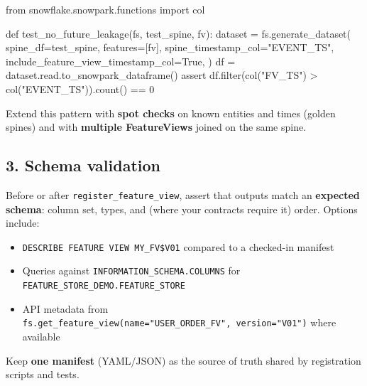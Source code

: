 \documentclass[
  letterpaper,
  DIV=11,
  numbers=noendperiod]{scrreprt}
\newenvironment{Shaded}{\begin{snugshade}}{\end{snugshade}}
\newcommand{\BuiltInTok}[1]{\textcolor[rgb]{0.00,0.23,0.31}{#1}}
\newcommand{\ControlFlowTok}[1]{\textcolor[rgb]{0.00,0.23,0.31}{#1}}
\newcommand{\DecValTok}[1]{\textcolor[rgb]{0.68,0.00,0.00}{#1}}
\newcommand{\ImportTok}[1]{\textcolor[rgb]{0.00,0.46,0.62}{#1}}
\newcommand{\KeywordTok}[1]{\textcolor[rgb]{0.00,0.23,0.31}{#1}}
\newcommand{\NormalTok}[1]{\textcolor[rgb]{0.00,0.23,0.31}{#1}}
\newcommand{\OperatorTok}[1]{\textcolor[rgb]{0.37,0.37,0.37}{#1}}
\newcommand{\StringTok}[1]{\textcolor[rgb]{0.13,0.47,0.30}{#1}}
\newcommand{\VariableTok}[1]{\textcolor[rgb]{0.07,0.07,0.07}{#1}}
\providecommand{\tightlist}{%
  \setlength{\itemsep}{0pt}\setlength{\parskip}{0pt}}\usepackage{longtable,booktabs,array}
\begin{document}
\begin{Shaded}
\begin{Highlighting}[]
\ImportTok{from}\NormalTok{ snowflake.snowpark.functions }\ImportTok{import}\NormalTok{ col}

\KeywordTok{def}\NormalTok{ test\_no\_future\_leakage(fs, test\_spine, fv):}
\NormalTok{    dataset }\OperatorTok{=}\NormalTok{ fs.generate\_dataset(}
\NormalTok{        spine\_df}\OperatorTok{=}\NormalTok{test\_spine,}
\NormalTok{        features}\OperatorTok{=}\NormalTok{[fv],}
\NormalTok{        spine\_timestamp\_col}\OperatorTok{=}\StringTok{"EVENT\_TS"}\NormalTok{,}
\NormalTok{        include\_feature\_view\_timestamp\_col}\OperatorTok{=}\VariableTok{True}\NormalTok{,}
\NormalTok{    )}
\NormalTok{    df }\OperatorTok{=}\NormalTok{ dataset.read.to\_snowpark\_dataframe()}
    \ControlFlowTok{assert}\NormalTok{ df.}\BuiltInTok{filter}\NormalTok{(col(}\StringTok{"FV\_TS"}\NormalTok{) }\OperatorTok{\textgreater{}}\NormalTok{ col(}\StringTok{"EVENT\_TS"}\NormalTok{)).count() }\OperatorTok{==} \DecValTok{0}
\end{Highlighting}
\end{Shaded}

Extend this pattern with \textbf{spot checks} on known entities and
times (golden spines) and with \textbf{multiple FeatureViews} joined on
the same spine.

\hypertarget{schema-validation}{%
\subsection{3. Schema validation}\label{schema-validation}}

Before or after \texttt{register\_feature\_view}, assert that outputs
match an \textbf{expected schema}: column set, types, and (where your
contracts require it) order. Options include:

\begin{itemize}
\tightlist
\item
  \texttt{DESCRIBE\ FEATURE\ VIEW\ MY\_FV\$V01} compared to a checked-in
  manifest
\item
  Queries against \texttt{INFORMATION\_SCHEMA.COLUMNS} for
  \texttt{FEATURE\_STORE\_DEMO.FEATURE\_STORE}
\item
  API metadata from
  \texttt{fs.get\_feature\_view(name="USER\_ORDER\_FV",\ version="V01")}
  where available
\end{itemize}

Keep \textbf{one manifest} (YAML/JSON) as the source of truth shared by
registration scripts and tests.
\end{document}
